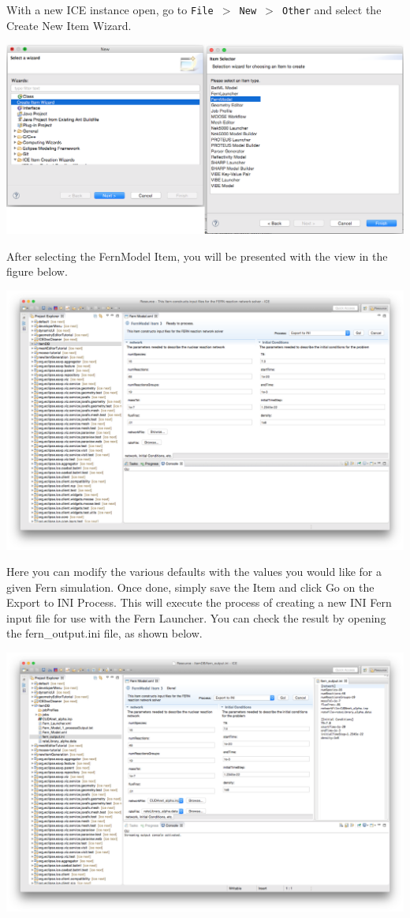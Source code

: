 With a new ICE instance open, go to \texttt{File $>$ New $>$ Other} and select
the Create New Item Wizard. 
\begin{center} \includegraphics[width=\textwidth]{figures/creatingFernModelItem}
\end{center}
After selecting the FernModel Item, you will be presented with the view in the
figure below. 
\begin{center} \includegraphics[width=\textwidth]{figures/fernmodelItem}
\end{center}
Here you can modify the various defaults with the values you would like for a
given Fern simulation. Once done, simply save the Item and click Go on the
Export to INI Process. This will execute the process of creating a new INI Fern
input file for use with the Fern Launcher. You can check the result by opening
the fern\_output.ini file, as shown below. 
\begin{center} \includegraphics[width=\textwidth]{figures/result}
\end{center}

